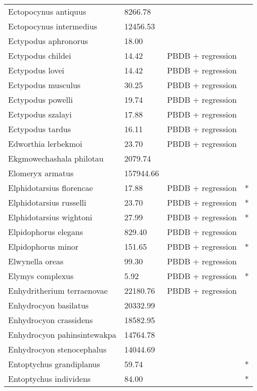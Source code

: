 \documentclass{article}
\begin{document}
\begin{center}
\begin{longtable}{p{} p{} p{} p{}}
    Ectopocynus antiquus & 8266.78 & \cite{Tomiya2013} &  \\ 
    Ectopocynus intermedius & 12456.53 & \cite{Tomiya2013} &  \\ 
    Ectypodus aphronorus & 18.00 & \cite{Wilson2012} &  \\ 
    Ectypodus childei & 14.42 & PBDB + regression &  \\ 
    Ectypodus lovei & 14.42 & PBDB + regression &  \\ 
    Ectypodus musculus & 30.25 & PBDB + regression &  \\ 
    Ectypodus powelli & 19.74 & PBDB + regression &  \\ 
    Ectypodus szalayi & 17.88 & PBDB + regression &  \\ 
    Ectypodus tardus & 16.11 & PBDB + regression &  \\ 
    Edworthia lerbekmoi & 23.70 & PBDB + regression &  \\ 
    Ekgmowechashala philotau & 2079.74 & \cite{Tomiya2013} &  \\ 
    Elomeryx armatus & 157944.66 & \cite{Tomiya2013} &  \\ 
    Elphidotarsius florencae & 17.88 & PBDB + regression & * \\ 
    Elphidotarsius russelli & 23.70 & PBDB + regression & * \\ 
    Elphidotarsius wightoni & 27.99 & PBDB + regression & * \\ 
    Elpidophorus elegans & 829.40 & PBDB + regression &  \\ 
    Elpidophorus minor & 151.65 & PBDB + regression & * \\ 
    Elwynella oreas & 99.30 & PBDB + regression &  \\ 
    Elymys complexus & 5.92 & PBDB + regression & * \\ 
    Enhydritherium terraenovae & 22180.76 & PBDB + regression &  \\ 
    Enhydrocyon basilatus & 20332.99 & \cite{Tomiya2013} &  \\ 
    Enhydrocyon crassidens & 18582.95 & \cite{Tomiya2013} &  \\ 
    Enhydrocyon pahinsintewakpa & 14764.78 & \cite{Tomiya2013} &  \\ 
    Enhydrocyon stenocephalus & 14044.69 & \cite{Tomiya2013} &  \\ 
    Entoptychus grandiplanus & 59.74 & \cite{Tomiya2013} & * \\ 
    Entoptychus individens & 84.00 & \cite{McKenna2011} & * \\ 

\end{longtable}
\end{center}
\end{document}
